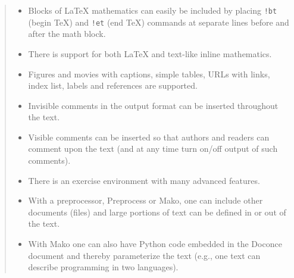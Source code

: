\documentclass[a4paper]{article}
\begin{document}
\begin{quote}
\begin{itemize}
\item Blocks of LaTeX mathematics can easily be included by placing
\texttt{!bt} (begin TeX) and \texttt{!et} (end TeX) commands at separate lines
before and after the math block.

\item There is support for both LaTeX and text-like inline mathematics.

\item Figures and movies with captions, simple tables,
URLs with links, index list, labels and references are supported.

\item Invisible comments in the output format can be inserted throughout
the text.

\item Visible comments can be inserted so that authors and readers can
comment upon the text (and at any time turn on/off output of such
comments).

\item There is an exercise environment with many advanced features.

\item With a preprocessor, Preprocess or Mako, one can include
other documents (files) and large portions of text can be defined
in or out of the text.

\item With Mako one can also have Python code
embedded in the Doconce document and thereby parameterize the
text (e.g., one text can describe programming in two languages).

\end{itemize}

\end{quote}
\end{document}

